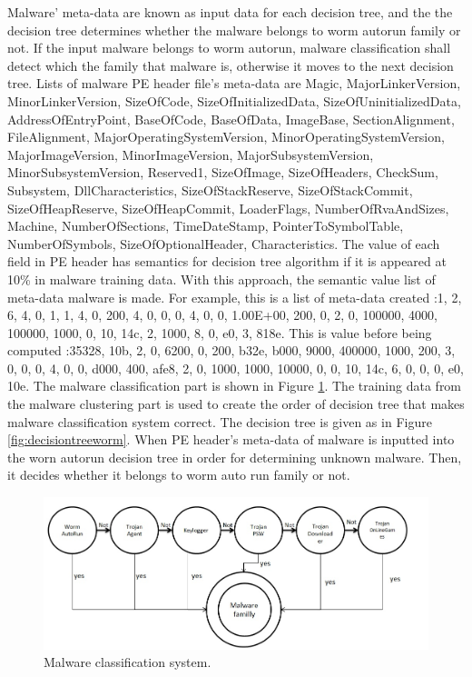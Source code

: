 Malware' meta-data are known as input data for each decision tree, and the the decision tree determines whether the malware belongs to worm autorun family or not. If the input malware belongs to worm autorun, malware classification shall detect which the family that malware is, otherwise it moves to the next decision tree. Lists of malware PE header file's meta-data are Magic, MajorLinkerVersion, MinorLinkerVersion, SizeOfCode, SizeOfInitializedData, SizeOfUninitializedData, AddressOfEntryPoint, BaseOfCode, BaseOfData, ImageBase, SectionAlignment, FileAlignment, MajorOperatingSystemVersion, MinorOperatingSystemVersion, MajorImageVersion, MinorImageVersion, MajorSubsystemVersion, MinorSubsystemVersion, Reserved1, SizeOfImage, SizeOfHeaders, CheckSum, Subsystem, DllCharacteristics, SizeOfStackReserve, SizeOfStackCommit, SizeOfHeapReserve, SizeOfHeapCommit, LoaderFlags, NumberOfRvaAndSizes, Machine, NumberOfSections, TimeDateStamp, PointerToSymbolTable, NumberOfSymbols, SizeOfOptionalHeader, Characteristics. The value of each field in PE header has semantics for decision tree algorithm if it is appeared at 10\% in malware training data. With this approach, the semantic value list of meta-data malware is made. For example, this is a list of meta-data created :1, 2, 6, 4, 0, 1, 1, 4, 0, 200, 4, 0, 0, 0, 4, 0, 0, 1.00E+00, 200, 0, 2, 0, 100000, 4000, 100000, 1000, 0, 10, 14c, 2, 1000, 8, 0, e0, 3, 818e. This is value before being computed :35328, 10b, 2, 0, 6200, 0, 200, b32e, b000, 9000, 400000, 1000, 200, 3, 0, 0, 0, 4, 0, 0, d000, 400, afe8, 2, 0, 1000, 1000, 10000, 0, 0, 10, 14c, 6, 0, 0, 0, e0, 10e. 
The malware classification part is shown in Figure \ref{fig:classification}. The training data from the malware clustering part is used to create the order of decision tree that makes malware classification system correct.
The decision tree is given as in Figure \ref{fig:decisiontreeworm}. When PE header's meta-data of malware is inputted into the worn autorun decision tree in order for determining unknown malware. Then, it decides whether it belongs to worm auto run family or not.\\
\begin{figure}[h!]
\centering
\includegraphics[width=1\textwidth]{graph/classification.jpg}
\caption{Malware classification system.}
\label{fig:classification}
\end{figure}
